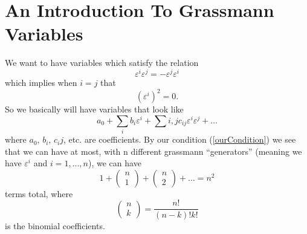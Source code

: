\section{An Introduction To Grassmann Variables}

We want to have variables which satisfy the relation
\begin{equation}\label{generalizationOfCliffordAlgebras}
\varepsilon^i\varepsilon^j=-\varepsilon^j\varepsilon^i
\end{equation}
which implies when $i=j$ that
\begin{equation}\label{ourCondition}
(\varepsilon^i)^2=0.
\end{equation}
So we basically will have variables that look like
\begin{equation}
a_{0} + \sum_{i}b_{i}\varepsilon^{i} + \sum{i,j}c_{ij}\varepsilon^{i}\varepsilon^{j} + \ldots
\end{equation}
where $a_0$, $b_i$, $c_ij$, etc. are coefficients. By our condition (\ref{ourCondition})
we see that we can have at most, with n different grassmann ``generators''
(meaning we have $\varepsilon^i$ and $i=1,...,n$), we can have 
\begin{equation}
1 + \begin{pmatrix}n\\1\end{pmatrix} + \begin{pmatrix}n\\2\end{pmatrix} + \ldots
= n^2
\end{equation}
terms total, where
\begin{equation}
\begin{pmatrix}n\\k\end{pmatrix} = \frac{n!}{(n-k)!k!}
\end{equation}
is the binomial coefficients.
